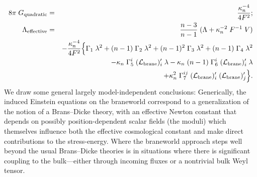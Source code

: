 \documentclass[a4paper,10pt]{article}
\begin{document}
{\begin{eqnarray}
\\
8\pi\;G_{\mathrm{quadratic}} &=& 
{\kappa_n^{-4}\over4F^2}; 
\\
\Lambda_{\mathrm{effective}} &=&
{n-3 \over n-1} \;(\Lambda + \kappa_n^{-2}\;F^{-1} \; V)
\nonumber\\
&&
- {\kappa_n^{-4}\over4F^2} 
\Big\{
\Gamma_1  \; \lambda^2 
+ (n-1)    \;\Gamma_2 \;\lambda^2
+ (n-1)^2  \;\Gamma_3 \;\lambda^2
+ (n-1)    \;\Gamma_4 \;\lambda^2 
\nonumber\\
&&
\quad
-\kappa_n \; \Gamma_5^i  \;({\mathcal L}_{\mathrm{brane}})'_i  \; \lambda
-\kappa_n \; (n-1) \; \Gamma_6^i  \;({\mathcal L}_{\mathrm{brane}})'_i  \; \lambda
\nonumber\\
&&
\quad
+\kappa_n^2 \; \Gamma_7^{ij}  \;({\mathcal L}_{\mathrm{brane}})'_i   \;({\mathcal L}_{\mathrm{brane}})'_j
\Big\}.
\end{eqnarray}
%
We draw some general largely model-independent conclusions:
Generically, the induced Einstein equations on the braneworld
correspond to a generalization of the notion of a Brans--Dicke theory,
with an effective Newton constant that depends on possibly
position-dependent scalar fields (the moduli) which themselves
influence both the effective cosmological constant and make direct
contributions to the stress-energy. Where the braneworld approach
steps well beyond the usual Brans--Dicke theories is in situations
where there is significant coupling to the bulk---either through
incoming fluxes or a nontrivial bulk Weyl tensor.

}
\end{document}
